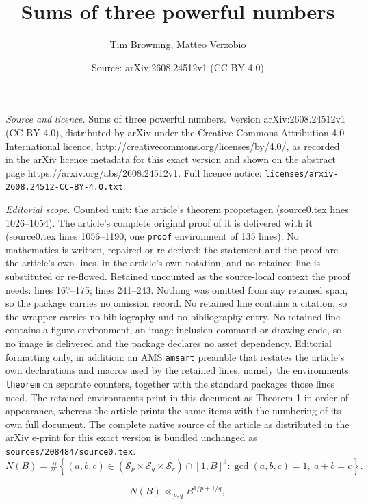 \documentclass[10pt,a4paper]{amsart}
\title{Sums of three powerful numbers}
\author{Tim Browning, Matteo Verzobio}
\date{Source: arXiv:2608.24512v1 (CC BY 4.0)}
\begin{document}
\maketitle

\noindent\emph{Source and licence.} Sums of three powerful numbers. Version arXiv:2608.24512v1 (CC BY 4.0), distributed by arXiv under the Creative Commons Attribution 4.0 International licence, http://creativecommons.org/licenses/by/4.0/, as recorded in the arXiv licence metadata for this exact version and shown on the abstract page https://arxiv.org/abs/2608.24512v1. Full licence notice: \texttt{licenses/arxiv-2608.24512-CC-BY-4.0.txt}.\par\smallskip

\noindent\textit{Editorial scope.} Counted unit: the article's theorem prop:etagen (source0.tex lines 1026--1054). The article's complete original proof of it is delivered with it (source0.tex lines 1056--1190, one \texttt{proof} environment of 135 lines). No mathematics is written, repaired or re-derived: the statement and the proof are the article's own lines, in the article's own notation, and no retained line is substituted or re-flowed.  Retained uncounted as the source-local context the proof needs: lines 167--175; lines 241--243.  Nothing was omitted from any retained span, so the package carries no omission record.  No retained line contains a citation, so the wrapper carries no bibliography and no bibliography entry.  No retained line contains a figure environment, an image-inclusion command or drawing code, so no image is delivered and the package declares no asset dependency.  Editorial formatting only, in addition: an AMS \texttt{amsart} preamble that restates the article's own declarations and macros used by the retained lines, namely the environments \texttt{theorem} on separate counters, together with the standard packages those lines need.  The retained environments print in this document as Theorem 1 in order of appearance, whereas the article prints the same items with the numbering of its own full document.  The complete native source of the article as distributed in the arXiv e-print for this exact version is bundled unchanged as \texttt{sources/208484/source0.tex}.
\begin{equation}\label{eq:hawk}
N(B)
 =
 \#\left\{
 (a,b,c)\in
 (\mathcal S_p\times\mathcal S_q\times\mathcal S_r)\cap[1,B]^3:
 \gcd(a,b,c)=1,\ a+b=c
 \right\}.
\end{equation}

\begin{equation}\label{eq:triv}
N(B)\ll_{p,q}B^{1/p+1/q},
\end{equation}
\end{document}
